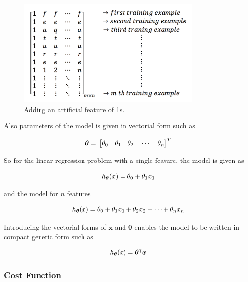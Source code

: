 \begin{figure}
\begin{center}
\includegraphics[width=9cm]{figures/addArtificialFeature}    %
\caption{Adding an artificial feature of 1s.} 
\label{fig:addArtificialFeature}
\end{center}
\end{figure}

Also parameters of the model is given in vectorial form such as

\begin{equation}{\label{eqn:parameterVector}}
\bm{\theta}
=\,
\begin{bmatrix}
\theta_0\quad \theta_1 \quad  \theta_2 \quad \cdots \quad \theta_n 
\end{bmatrix}
^T
\end{equation} 

So for the linear regression problem with a single feature, the model is given as

\begin{equation}{\label{eqn:costFuncOneFeature}}
h_{{\bm{\theta}}}(x) = \theta_0 + \theta_1 x_1
\end{equation} 

and the model for $n$ features

\begin{equation}{\label{eqn:costFuncMltplFeature}}
h_{{\bm{\theta}}}(x) = \theta_0 + \theta_1 x_1 + \theta_2 x_2 + \cdots+ \theta_n x_n
\end{equation}

Introducing the vectorial forms of $\bm{x}$ and $\bm{\theta}$ enables the model to be written in compact generic form such as 

\begin{equation}{\label{eqn:costFuncMltplFeature}}
h_{{\bm{\theta}}}(x) = {\bm{\theta}}^\intercal \bm{x}
\end{equation}

\subsubsection{Cost Function}

